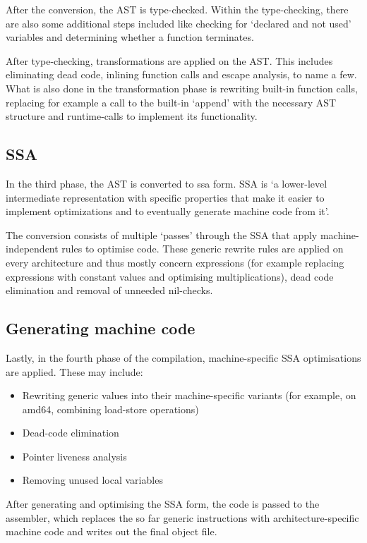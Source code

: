 After the conversion, the AST is type-checked. Within the type-checking, there
are also some additional steps included like checking for `declared and not used'
variables and determining whether a function terminates.

After type-checking, transformations are applied on the AST. This includes
eliminating dead code, inlining function calls and escape analysis, to name a few.
What is also done in the transformation phase is rewriting built-in function
calls, replacing for example a call to the built-in `append' with the necessary
AST structure and runtime-calls to implement its functionality.

\subsection{SSA}

In the third phase, the AST is converted to \gls{ssa} form. SSA  is `a
lower-level intermediate representation with specific properties that make it
easier to implement optimizations and to eventually generate machine code from
it'\autocite{compiler-readme}.

The conversion consists of multiple `passes' through the SSA that
apply machine-independent rules to optimise code. These generic
rewrite rules are applied on every architecture and thus mostly
concern expressions (for example replacing expressions with constant values and
optimising multiplications), dead code elimination and removal of unneeded
nil-checks.

\subsection{Generating machine code}

Lastly, in the fourth phase of the compilation, machine-specific
SSA optimisations are applied. These may include:
\begin{itemize}
    \item Rewriting generic values into their machine-specific variants
        (for example, on amd64, combining load-store operations)
    \item Dead-code elimination
    \item Pointer liveness analysis
    \item Removing unused local variables
\end{itemize}

After generating and optimising the SSA form, the code is passed to the
assembler, which replaces the so far generic instructions with
architecture-specific machine code and writes out the final object file\autocite{compiler-readme}.
